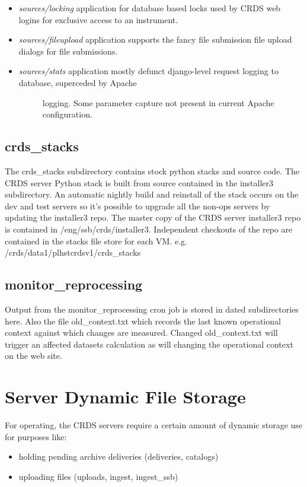 \documentclass[letterpaper,10pt,english]{sphinxmanual}
\begin{document}
\begin{itemize}
\begin{description}
\end{description}

\item {} 
\emph{sources/locking}     application for database based locks used by CRDS web logins for exclusive access to an instrument.

\item {} 
\emph{sources/fileupload}  application supports the fancy file submission file upload dialogs for file submissions.

\item {} \begin{description}
\item[{\emph{sources/stats}      application mostly defunct django-level request logging to database,  superceded by Apache}] \leavevmode
logging.  Some parameter capture not present in current Apache configuration.

\end{description}

\end{itemize}


\subsection{crds\_stacks}
\label{server_guide:crds-stacks}
The crds\_stacks subdirectory contains stock python stacks and source code.  The CRDS server Python stack is built
from source contained in the installer3 subdirectory.  An automatic nightly build and reinstall of the stack occurs on the
dev and test servers so it's possible to upgrade all the non-ops servers by updating the installer3 repo.  The
master copy of the CRDS server installer3 repo is contained in /eng/ssb/crds/installer3.   Independent checkouts
of the repo are contained in the stacks file store for each VM.   e.g. /crds/data1/plhstcrdsv1/crds\_stacks


\subsection{monitor\_reprocessing}
\label{server_guide:monitor-reprocessing}
Output from the monitor\_reprocessing cron job is stored in dated subdirectories here.  Also the file old\_context.txt
which records the last known operational context against which changes are measured.  Changed old\_context.txt will
trigger an affected datasets calculation as will changing the operational context on the web site.


\section{Server Dynamic File Storage}
\label{server_guide:server-dynamic-file-storage}
For operating,  the CRDS servers require a certain amount of dynamic storage use for purposes like:
\begin{itemize}
\item {} 
holding pending archive deliveries  (deliveries, catalogs)

\item {} 
uploading files (uploads, ingest, ingest\_ssb)

\end{itemize}
\end{document}
